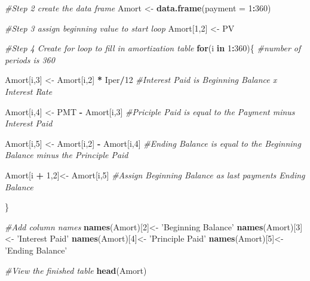 \documentclass[]{article}
\newenvironment{Shaded}{\begin{snugshade}}{\end{snugshade}}
\newcommand{\CommentTok}[1]{\textcolor[rgb]{0.56,0.35,0.01}{\textit{#1}}}
\newcommand{\ControlFlowTok}[1]{\textcolor[rgb]{0.13,0.29,0.53}{\textbf{#1}}}
\newcommand{\DataTypeTok}[1]{\textcolor[rgb]{0.13,0.29,0.53}{#1}}
\newcommand{\DecValTok}[1]{\textcolor[rgb]{0.00,0.00,0.81}{#1}}
\newcommand{\KeywordTok}[1]{\textcolor[rgb]{0.13,0.29,0.53}{\textbf{#1}}}
\newcommand{\NormalTok}[1]{#1}
\newcommand{\OperatorTok}[1]{\textcolor[rgb]{0.81,0.36,0.00}{\textbf{#1}}}
\newcommand{\StringTok}[1]{\textcolor[rgb]{0.31,0.60,0.02}{#1}}
\begin{document}
\begin{Shaded}
\begin{Highlighting}[]
\CommentTok{#Step 2 create the data frame}
\NormalTok{Amort <-}\StringTok{ }\KeywordTok{data.frame}\NormalTok{(}\DataTypeTok{payment =} \DecValTok{1}\OperatorTok{:}\DecValTok{360}\NormalTok{)}

\CommentTok{#Step 3 assign beginning value to start loop}
\NormalTok{Amort[}\DecValTok{1}\NormalTok{,}\DecValTok{2}\NormalTok{] <-}\StringTok{ }\NormalTok{PV}

\CommentTok{#Step 4 Create for loop to fill in amortization table}
 \ControlFlowTok{for}\NormalTok{(i }\ControlFlowTok{in} \DecValTok{1}\OperatorTok{:}\DecValTok{360}\NormalTok{)\{  }\CommentTok{#number of periods is 360}

\NormalTok{Amort[i,}\DecValTok{3}\NormalTok{] <-}\StringTok{ }\NormalTok{Amort[i,}\DecValTok{2}\NormalTok{] }\OperatorTok{*}\StringTok{ }\NormalTok{Iper}\OperatorTok{/}\DecValTok{12} \CommentTok{#Interest Paid is Beginning Balance x Interest Rate}

\NormalTok{Amort[i,}\DecValTok{4}\NormalTok{] <-}\StringTok{ }\NormalTok{PMT }\OperatorTok{-}\StringTok{ }\NormalTok{Amort[i,}\DecValTok{3}\NormalTok{] }\CommentTok{#Priciple Paid is equal to the Payment minus Interest Paid}

\NormalTok{Amort[i,}\DecValTok{5}\NormalTok{] <-}\StringTok{ }\NormalTok{Amort[i,}\DecValTok{2}\NormalTok{] }\OperatorTok{-}\StringTok{ }\NormalTok{Amort[i,}\DecValTok{4}\NormalTok{] }\CommentTok{#Ending Balance is equal to the Beginning Balance minus the Principle Paid}

\NormalTok{Amort[i }\OperatorTok{+}\StringTok{ }\DecValTok{1}\NormalTok{,}\DecValTok{2}\NormalTok{]<-}\StringTok{ }\NormalTok{Amort[i,}\DecValTok{5}\NormalTok{] }\CommentTok{#Assign Beginning Balance as last payments Ending Balance}

\NormalTok{\}}

\CommentTok{#Add column names}
\KeywordTok{names}\NormalTok{(Amort)[}\DecValTok{2}\NormalTok{]<-}\StringTok{ 'Beginning Balance'}
\KeywordTok{names}\NormalTok{(Amort)[}\DecValTok{3}\NormalTok{]<-}\StringTok{ 'Interest Paid'}
\KeywordTok{names}\NormalTok{(Amort)[}\DecValTok{4}\NormalTok{]<-}\StringTok{ 'Principle Paid'}
\KeywordTok{names}\NormalTok{(Amort)[}\DecValTok{5}\NormalTok{]<-}\StringTok{ 'Ending Balance'}

\CommentTok{#View the finished table}
\KeywordTok{head}\NormalTok{(Amort)}
\end{Highlighting}
\end{Shaded}
\end{document}
